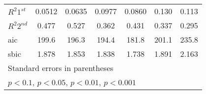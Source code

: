 \begin{table}
\begin{center}
{\begin{tabular}{l*{6}{c}}
$R^2 1^{st}$      &   0.0512         &   0.0635         &   0.0977         &   0.0860         &    0.130         &    0.113         \\
$R^2 2^{nd}$     &    0.477         &    0.527         &    0.362         &    0.431         &    0.337         &    0.295         \\
aic       &    199.6         &    196.3         &    194.4         &    181.8         &    201.1         &    235.8         \\
sbic      &    1.878         &    1.853         &    1.838         &    1.738         &    1.891         &    2.163         \\
\hline\hline
\multicolumn{7}{l}{\footnotesize Standard errors in parentheses}\\
\multicolumn{7}{l}{\footnotesize \sym{+} \(p<0.1\), \sym{*} \(p<0.05\), \sym{**} \(p<0.01\), \sym{***} \(p<0.001\)}\\
\end{tabular}
}

\end{center}
\end{table}

